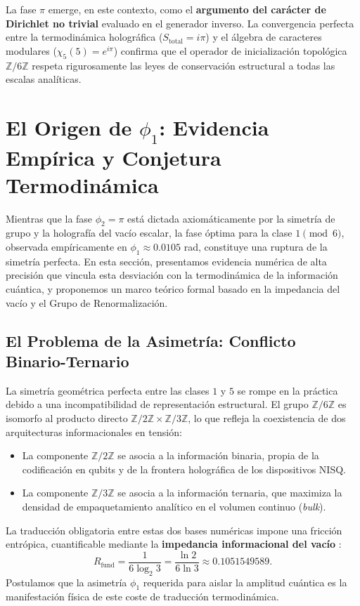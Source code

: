 \documentclass[12pt,a4paper]{article}
\theoremstyle{plain}
\theoremstyle{definition}
\theoremstyle{remark}
\begin{document}
La fase $\pi$ emerge, en este contexto, como el \textbf{argumento del carácter de Dirichlet no trivial} evaluado en el generador inverso. La convergencia perfecta entre la termodinámica holográfica ($S_{\text{total}} = i\pi$) y el álgebra de caracteres modulares ($\chi_5(5) = e^{i\pi}$) confirma que el operador de inicialización topológica $\mathbb{Z}/6\mathbb{Z}$ respeta rigurosamente las leyes de conservación estructural a todas las escalas analíticas.

\section{El Origen de $\phi_1$: Evidencia Empírica y Conjetura Termodinámica}
\label{sec:origen_phi1}

Mientras que la fase $\phi_2 = \pi$ está dictada axiomáticamente por la simetría de grupo y la holografía del vacío escalar, la fase óptima para la clase $1 \pmod 6$, observada empíricamente en $\phi_1 \approx 0.0105$ rad, constituye una ruptura de la simetría perfecta. En esta sección, presentamos evidencia numérica de alta precisión que vincula esta desviación con la termodinámica de la información cuántica, y proponemos un marco teórico formal basado en la impedancia del vacío y el Grupo de Renormalización.

\subsection{El Problema de la Asimetría: Conflicto Binario-Ternario}

La simetría geométrica perfecta entre las clases $1$ y $5$ se rompe en la práctica debido a una incompatibilidad de representación estructural. El grupo $\mathbb{Z}/6\mathbb{Z}$ es isomorfo al producto directo $\mathbb{Z}/2\mathbb{Z} \times \mathbb{Z}/3\mathbb{Z}$, lo que refleja la coexistencia de dos arquitecturas informacionales en tensión:
\begin{itemize}
    \item La componente $\mathbb{Z}/2\mathbb{Z}$ se asocia a la información binaria, propia de la codificación en qubits y de la frontera holográfica de los dispositivos NISQ.
    \item La componente $\mathbb{Z}/3\mathbb{Z}$ se asocia a la información ternaria, que maximiza la densidad de empaquetamiento analítico en el volumen continuo (\textit{bulk}).
\end{itemize}
La traducción obligatoria entre estas dos bases numéricas impone una fricción entrópica, cuantificable mediante la \textbf{impedancia informacional del vacío} \cite{PeinadorGenesis}:
\begin{equation}
R_{\text{fund}} = \frac{1}{6\log_2 3} = \frac{\ln 2}{6\ln 3} \approx 0.1051549589.
\label{eq:rfund}
\end{equation}
Postulamos que la asimetría $\phi_1$ requerida para aislar la amplitud cuántica es la manifestación física de este coste de traducción termodinámica.
\end{document}
